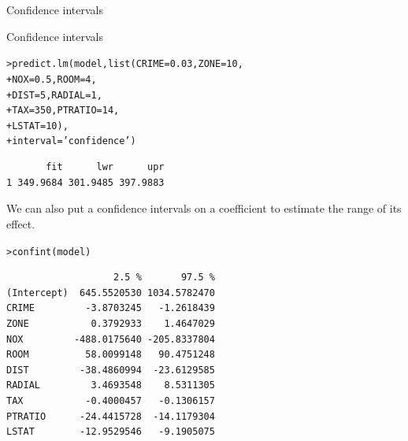 \documentclass{beamer}\usepackage[]{graphicx}\usepackage[]{color}
\makeatletter
\newcommand{\hlnum}[1]{\textcolor[rgb]{0.824,0.412,0.118}{#1}}%
\newcommand{\hlstr}[1]{\textcolor[rgb]{1,0.894,0.71}{#1}}%
\newcommand{\hlstd}[1]{\textcolor[rgb]{1,0.894,0.769}{#1}}%
\newcommand{\hlkwc}[1]{\textcolor[rgb]{0.78,0.941,0.545}{#1}}%
\newcommand{\hlkwd}[1]{\textcolor[rgb]{1,0.78,0.769}{#1}}%
\newenvironment{kframe}{%
 \def\at@end@of@kframe{}%
 \ifinner\ifhmode%
  \def\at@end@of@kframe{\end{minipage}}%
  \begin{minipage}{\columnwidth}%
 \fi\fi%
 \def\FrameCommand##1{\hskip\@totalleftmargin \hskip-\fboxsep
 \colorbox{shadecolor}{##1}\hskip-\fboxsep
     \hskip-\linewidth \hskip-\@totalleftmargin \hskip\columnwidth}%
 \MakeFramed {\advance\hsize-\width
   \@totalleftmargin\z@ \linewidth\hsize
   \@setminipage}}%
 {\par\unskip\endMakeFramed%
 \at@end@of@kframe}
\newenvironment{knitrout}{}{} %
\makeatother
\begin{document}
\begin{darkframes}
\begin{frame}[fragile]{Confidence intervals}
    
    \end{frame}
        
      
    
    \begin{frame}[fragile]{Confidence intervals}
    
\begin{knitrout}
\begin{kframe}
\begin{alltt}
\hlstd{> }\hlkwd{predict.lm}\hlstd{(model,} \hlkwd{list}\hlstd{(}\hlkwc{CRIME}\hlstd{=}\hlnum{0.03}\hlstd{,} \hlkwc{ZONE}\hlstd{=}\hlnum{10}\hlstd{,}
\hlstd{+ }                       \hlkwc{NOX}\hlstd{=}\hlnum{0.5}\hlstd{,} \hlkwc{ROOM}\hlstd{=}\hlnum{4}\hlstd{,}
\hlstd{+ }                       \hlkwc{DIST}\hlstd{=}\hlnum{5}\hlstd{,}  \hlkwc{RADIAL}\hlstd{=}\hlnum{1}\hlstd{,}
\hlstd{+ }                       \hlkwc{TAX}\hlstd{=}\hlnum{350}\hlstd{,} \hlkwc{PTRATIO}\hlstd{=}\hlnum{14}\hlstd{,}
\hlstd{+ }                       \hlkwc{LSTAT}\hlstd{=}\hlnum{10}\hlstd{),}
\hlstd{+ }                       \hlkwc{interval} \hlstd{=} \hlstr{'confidence'}\hlstd{)}
\end{alltt}
\begin{verbatim}
       fit      lwr      upr
1 349.9684 301.9485 397.9883
\end{verbatim}
\end{kframe}
\end{knitrout}
     \lc
     \end{frame}
     
     
     
     \begin{frame}[fragile]%
        We can also put a confidence intervals on a coefficient to estimate the range of its effect.
        
\begin{knitrout}
\begin{kframe}
\begin{alltt}
\hlstd{> }\hlkwd{confint}\hlstd{(model)}
\end{alltt}
\begin{verbatim}
                   2.5 %       97.5 %
(Intercept)  645.5520530 1034.5782470
CRIME         -3.8703245   -1.2618439
ZONE           0.3792933    1.4647029
NOX         -488.0175640 -205.8337804
ROOM          58.0099148   90.4751248
DIST         -38.4860994  -23.6129585
RADIAL         3.4693548    8.5311305
TAX           -0.4000457   -0.1306157
PTRATIO      -24.4415728  -14.1179304
LSTAT        -12.9529546   -9.1905075
\end{verbatim}
\end{kframe}
\end{knitrout}
     

\end{frame}
\end{darkframes}
\end{document}
